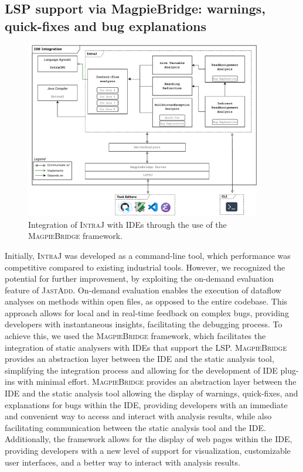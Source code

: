 \subsection{LSP support via MagpieBridge: warnings, quick-fixes and bug explanations}
\begin{figure}
  \centering
  \includegraphics[width=0.92\textwidth]{kappa/img/IDEIntegration.pdf}
  \caption{\label{fig:IDEIntegration} Integration of \textsc{IntraJ} with IDEs through the use of the \textsc{MagpieBridge} framework.}
\end{figure}
Initially, \textsc{IntraJ} was developed as a command-line tool, which performance was competitive
compared to existing industrial tools. However, we recognized the potential
for further improvement, by exploiting the on-demand evaluation feature of \textsc{JastAdd}.
On-demand evaluation enables the execution of dataflow analyses
on methods within open files, as opposed to the entire codebase. This approach
allows for local and in real-time feedback on complex bugs, providing developers
with instantaneous insights, facilitating the debugging process.
To achieve this, we used the \textsc{MagpieBridge} framework, which facilitates the integration
of static analysers with IDEs that support the LSP. \textsc{MagpieBridge} provides an
abstraction layer between the IDE and the static analysis tool, simplifying the
integration process and allowing for the development of IDE plug-ins with minimal effort.
\textsc{MagpieBridge} provides an abstraction layer between the IDE and the static
analysis tool allowing the display of warnings, quick-fixes, and explanations
for bugs within the IDE, providing developers with an immediate and convenient way to
access and interact with analysis results, while also facilitating communication
between the static analysis tool and the IDE. Additionally, the framework allows
for the display of web pages within the IDE, providing developers with a new level
of support for visualization, customizable user interfaces, and a better way to
interact with analysis results.

